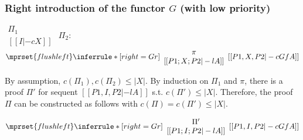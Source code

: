 \subsubsection{Right introduction of the functor $G$ (with low priority)}
\begin{center}
  \scriptsize
  \begin{math}
    \begin{array}{c}
      \Pi_1 \\
      {[[I |-c X]]}
    \end{array}
  \end{math}
  \qquad\qquad
  $\Pi_2$:
  \begin{math}
    $$\mprset{flushleft}
    \inferrule* [right={\tiny Gr}] {
      {
        \begin{array}{c}
          \pi \\
          {[[P1; X; P2 |-l A]]}
        \end{array}
      }
    }{[[P1, X, P2 |-c Gf A]]}
  \end{math}
\end{center}
By assumption, $c(\Pi_1),c(\Pi_2)\leq |X|$. By induction on $\Pi_1$
and $\pi$, there is a proof $\Pi'$ for sequent $[[P1, I, P2 |-l A]]$
s.t. $c(\Pi') \leq |X|$. Therefore, the proof $\Pi$ can be
constructed as follows with $c(\Pi) = c(\Pi') \leq |X|$.
\begin{center}
  \scriptsize
  \begin{math}
    $$\mprset{flushleft}
    \inferrule* [right={\tiny Gr}] {
      {
        \begin{array}{c}
          \Pi' \\
          {[[P1; I; P2 |-l A]]}
        \end{array}
      }
    }{[[P1, I, P2 |-c Gf A]]}
  \end{math}
\end{center}





